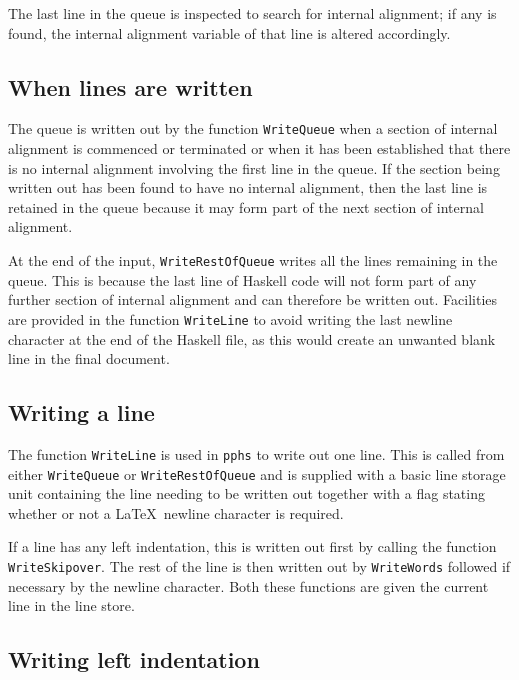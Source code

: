 The last line in the queue is inspected to search
for internal alignment; if any is found, the internal alignment variable of that
line is altered accordingly.

\subsection{When lines are written}

The queue is written out by the function {\tt WriteQueue} when a section of internal
alignment is commenced or terminated
or when it has been established that there is no internal alignment involving the first line
in the queue.  If the section being written out has been found to have
no internal alignment, then the last line is retained
in the queue because it may form part of the next section of internal alignment.

At the end of the input, {\tt WriteRestOfQueue} writes all the lines remaining in the queue.
This is because the last line of Haskell code will not form part of any further section of
internal alignment and can therefore be written out.  Facilities
are provided in the function {\tt WriteLine} to avoid writing the last newline
character at the end of the Haskell
file, as this would create an unwanted blank line in the final document.

\subsection{Writing a line}

The function {\tt WriteLine} is used in {\tt pphs} to write out one line.  This is
called from either {\tt WriteQueue} or {\tt WriteRestOfQueue} and is supplied with
a basic line storage unit containing the line needing to be written out together with a
flag stating whether or not a \LaTeX\ newline character is required.

If a line has any left indentation, this is written out first by calling the function
{\tt WriteSkipover}.  The rest of the line is then written out by {\tt WriteWords}
followed if necessary by the newline character.  Both these functions are given
the current line in the line store.

\subsection{Writing left indentation}

